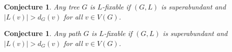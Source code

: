 \documentclass[12pt]{article}
\theoremstyle{plain}
\newtheorem{conjecture}[thm]{Conjecture}
\theoremstyle{definition}
\theoremstyle{remark}
\begin{document}
\begin{conjecture}
Any tree $G$ is $L$-fixable if $(G, L)$ is superabundant and $|L(v)| > d_G(v)$ for all $v \in V(G)$.
\end{conjecture}

\begin{conjecture}
Any path $G$ is $L$-fixable if $(G, L)$ is superabundant and $|L(v)| > d_G(v)$ for all $v \in V(G)$.
\end{conjecture}



\end{document}
